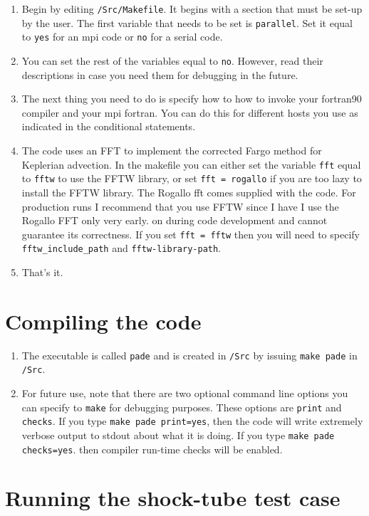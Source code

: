 \documentclass[11pt]{amsart}
\begin{document}
\begin{enumerate}
\item Begin by editing {\tt /Src/Makefile}.  It begins with a section that must be set-up by the user.  The first variable that needs to be set is {\tt parallel}.  Set it equal to {\tt yes} for an mpi code or {\tt no} for a serial code.
\item You can set the rest of the variables equal to {\tt no}.  However, read their descriptions in case you need them for debugging in the future.
\item The next thing you need to do is specify how to how to invoke your fortran90 compiler and your mpi fortran.  You can do this for different hosts you use as indicated in the conditional statements. 
\item The code uses an FFT to implement the corrected Fargo method for Keplerian advection.
In the makefile you can either set the variable {\tt fft} equal to {\tt fftw} to use the FFTW library, or set {\tt fft = rogallo} if you are too lazy to install the FFTW library.  The Rogallo fft comes supplied with the code.
For production runs I recommend  that you use FFTW since I have I use the Rogallo FFT only very early. on during code development and cannot guarantee its correctness.  If you set {\tt fft = fftw} then you will need to specify {\tt fftw\_include\_path} and {\tt fftw-library-path}.
\item That's it.
\end{enumerate}

\section{Compiling the code}

\begin{enumerate}
\item The executable is called {\tt pade} and is created in {\tt /Src}  by issuing {\tt make pade} in {\tt /Src}.
\item For future use, note that there are two optional command line options you can specify to {\tt make} for debugging purposes.  These options are {\tt print} and {\tt checks}.  If you type {\tt make pade print=yes}, then the code will write extremely verbose output to stdout about what it is doing.  If you type {\tt make pade checks=yes}. then compiler run-time checks will be enabled.
\end{enumerate}

\section{Running the shock-tube test case}
\end{document}
